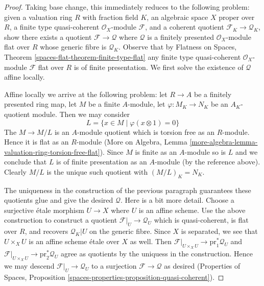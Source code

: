 \documentclass[10pt,a4paper]{amsart}
\theoremstyle{plain}
\theoremstyle{definition}
\theoremstyle{remark}
\numberwithin{equation}{subsection}
\begin{document}
\begin{proof}
Taking base change, this immediately reduces to the following
problem: given a valuation ring $R$ with fraction field $K$,
an algebraic space $X$ proper over $R$, a finite type quasi-coherent
$\mathcal{O}_X$-module $\mathcal{F}$, and a coherent
quotient $\mathcal{F}_K \to \mathcal{Q}_K$, show there exists
a quotient $\mathcal{F} \to \mathcal{Q}$ where $\mathcal{Q}$ is a
finitely presented $\mathcal{O}_X$-module
flat over $R$ whose generic fibre is $\mathcal{Q}_K$.
Observe that by Flatness on Spaces, Theorem
\ref{spaces-flat-theorem-finite-type-flat}
any finite type quasi-coherent $\mathcal{O}_X$-module
$\mathcal{F}$ flat over $R$ is of finite presentation.
We first solve the existence of $\mathcal{Q}$ affine locally.

\medskip\noindent
Affine locally we arrive at the following problem:
let $R \to A$ be a finitely presented ring map,
let $M$ be a finite $A$-module, let $\varphi : M_K \to N_K$ be
an $A_K$-quotient module. Then we may consider
$$
L = \{x \in M \mid \varphi(x \otimes 1) = 0 \}
$$
The $M \to M/L$ is an $A$-module quotient which is
torsion free as an $R$-module. Hence it is flat as an
$R$-module (More on Algebra, Lemma
\ref{more-algebra-lemma-valuation-ring-torsion-free-flat}).
Since $M$ is finite as an $A$-module so is $L$ and we
conclude that $L$ is of finite presentation as an $A$-module
(by the reference above). Clearly $M/L$ is the unique such
quotient with $(M/L)_K = N_K$.

\medskip\noindent
The uniqueness in the construction of the previous paragraph
guarantees these quotients glue and give the desired $\mathcal{Q}$.
Here is a bit more detail. Choose a surjective \'etale morphism
$U \to X$ where $U$ is an affine scheme. Use the above construction
to construct a quotient $\mathcal{F}|_U \to \mathcal{Q}_U$
which is quasi-coherent, is flat over $R$, and recovers $\mathcal{Q}_K|U$
on the generic fibre. Since $X$ is separated, we see that
$U \times_X U$ is an affine scheme \'etale over $X$ as well.
Then $\mathcal{F}|_{U \times_X U} \to \text{pr}_1^*\mathcal{Q}_U$ and
$\mathcal{F}|_{U \times_X U} \to \text{pr}_2^*\mathcal{Q}_U$
agree as quotients by the uniquess in the construction. Hence we may descend
$\mathcal{F}|_U \to \mathcal{Q}_U$ to a surjection
$\mathcal{F} \to \mathcal{Q}$ as desired (Properties of Spaces,
Proposition \ref{spaces-properties-proposition-quasi-coherent}).
\end{proof}
\end{document}
